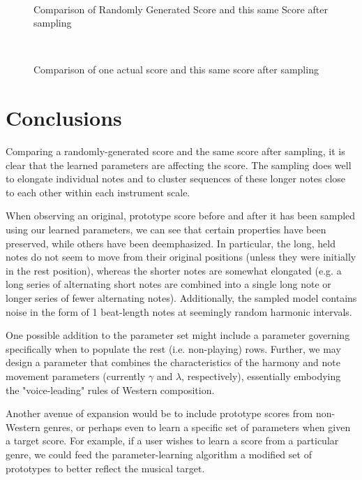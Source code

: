 \documentclass{article}
\begin{document}
\begin{figure}
\centering
\mbox{
\quad
{}
}
\centering
\caption{Comparison of Randomly Generated Score and this same Score after sampling}
\label{fig-all}
\end{figure}

\begin{figure}
\centering
\mbox{
\quad
{}
}
\centering
\caption{Comparison of one actual score and this same score after sampling}
\label{fig-all}
\end{figure}


\section{Conclusions}
Comparing a randomly-generated score and the same score after sampling, it is clear that the learned parameters are affecting the score.  The sampling does well to elongate individual notes and to cluster sequences of these longer notes close to each other within each instrument scale.

When observing an original, prototype score before and after it has been sampled using our learned parameters, we can see that certain properties have been preserved, while others have been deemphasized.  In particular, the long, held notes do not seem to move from their original positions (unless they were initially in the rest position), whereas the shorter notes are somewhat elongated (e.g. a long series of alternating short notes are combined into a single long note or longer series of fewer alternating notes).  Additionally, the sampled model contains noise in the form of 1 beat-length notes at seemingly random harmonic intervals.

One possible addition to the parameter set might include a parameter governing specifically when to populate the rest (i.e. non-playing) rows.  Further, we may design a parameter that combines the characteristics of the harmony and note movement parameters (currently $\gamma$ and $\lambda$, respectively), essentially embodying the "voice-leading" rules of Western composition.

Another avenue of expansion would be to include prototype scores from non-Western genres, or perhaps even to learn a specific set of parameters when given a target score.  For example, if a user wishes to learn a score from a particular genre, we could feed the parameter-learning algorithm a modified set of prototypes to better reflect the musical target.
\end{document}
